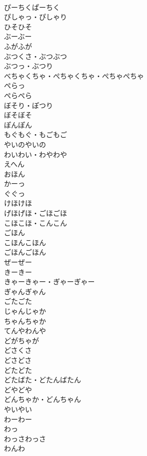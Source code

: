 \documentclass[8pt]{extreport}
\begin{document}
\begin{CJK}{UTF8}{min}
\\	ぴーちくぱーちく	
\\	ぴしゃっ・ぴしゃり	
\\	ひそひそ	
\\	ぶーぶー	
\\	ふがふが	
\\	ぶつくさ・ぶつぶつ	
\\	ぶつっ・ぶつり	
\\	べちゃくちゃ・ぺちゃくちゃ・ぺちゃぺちゃ	
\\	ぺらっ	
\\	ぺらぺら	
\\	ぼそり・ぽつり	
\\	ぼそぼそ	
\\	ぽんぽん	
\\	もぐもぐ・もごもご	
\\	やいのやいの	
\\	わいわい・わやわや	
\\	えへん	
\\	おほん	
\\	かーっ	
\\	ぐぐっ	
\\	けほけほ	
\\	げほげほ・ごほごほ	
\\	こほこほ・こんこん	
\\	ごほん	
\\	こほんこほん	
\\	ごほんごほん	
\\	ぜーぜー	
\\	きーきー	
\\	きゃーきゃー・ぎゃーぎゃー	
\\	ぎゃんぎゃん	
\\	ごたごた	
\\	じゃんじゃか	
\\	ちゃんちゃか	
\\	てんやわんや	
\\	どがちゃが	
\\	どさくさ	
\\	どさどさ	
\\	どたどた	
\\	どたばた・どたんばたん	
\\	どやどや	
\\	どんちゃか・どんちゃん	
\\	やいやい	
\\	わーわー	
\\	わっ	
\\	わっさわっさ	
\\	わんわ	

\end{CJK}
\end{document}
